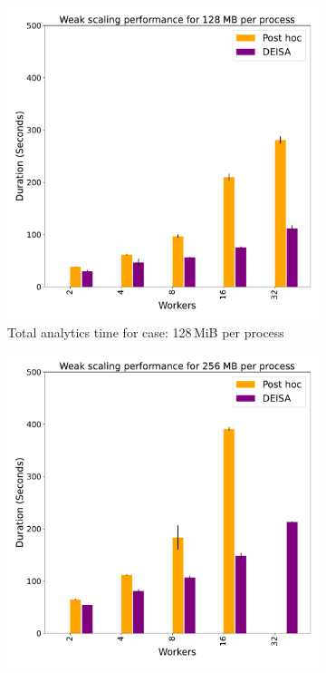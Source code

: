 \begin{figure}
     \centering
     \begin{subfigure}[b]{0.3\textwidth}
         \centering
         \includegraphics[width=\textwidth, height=\textwidth]{figures/128A_CH.pdf}
         \caption{Total analytics time for case: 128\,MiB per process}
         \label{fig:A128CH}
     \end{subfigure}
     \hfill
     \begin{subfigure}[b]{0.3\textwidth}
         \centering
         \includegraphics[width=\textwidth, height=\textwidth]{figures/256A_CH.pdf}

\end{subfigure}
\end{figure}
